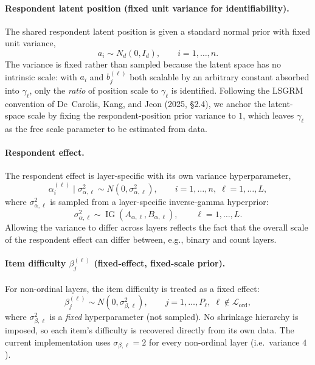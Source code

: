 \documentclass[11pt]{article}
\DeclareMathOperator{\IG}{IG}
\begin{document}
\paragraph{Respondent latent position (fixed unit variance for identifiability).}
The shared respondent latent position is given a standard normal prior with
fixed unit variance,
\begin{equation}
    a_i \sim N_d(0,I_d),\qquad i=1,\dots,n.
    \label{eq:a-prior}
\end{equation}
The variance is fixed rather than sampled because the latent space has no
intrinsic scale: with $a_i$ and $b_j^{(\ell)}$ both scalable by an arbitrary
constant absorbed into $\gamma_\ell$, only the \emph{ratio} of position scale
to $\gamma_\ell$ is identified.  Following the LSGRM convention of
De~Carolis, Kang, and Jeon (2025, \S2.4), we anchor the latent-space scale by
fixing the respondent-position prior variance to $1$, which leaves
$\gamma_\ell$ as the free scale parameter to be estimated from data.

\paragraph{Respondent effect.}
The respondent effect is layer-specific with its own variance hyperparameter,
\begin{equation}
    \alpha_i^{(\ell)}\mid \sigma_{\alpha,\ell}^2
    \sim N(0,\sigma_{\alpha,\ell}^2),
    \qquad i=1,\dots,n,\;\ell=1,\dots,L,
    \label{eq:alpha-prior}
\end{equation}
where $\sigma_{\alpha,\ell}^2$ is sampled from a layer-specific inverse-gamma
hyperprior:
\begin{equation}
    \sigma_{\alpha,\ell}^2 \sim \IG(A_{\alpha,\ell},B_{\alpha,\ell}),
    \qquad \ell=1,\dots,L.
    \label{eq:sigma-alpha-prior}
\end{equation}
Allowing the variance to differ across layers reflects the fact that the
overall scale of the respondent effect can differ between, e.g., binary and
count layers.

\paragraph{Item difficulty $\beta_j^{(\ell)}$ (fixed-effect, fixed-scale prior).}
For non-ordinal layers, the item difficulty is treated as a fixed effect:
\begin{equation}
    \beta_j^{(\ell)}\sim N(0,\sigma_{\beta,\ell}^2),
    \qquad j=1,\dots,P_\ell,\;\ell\notin\mathcal L_{\mathrm{ord}},
    \label{eq:beta-prior}
\end{equation}
where $\sigma_{\beta,\ell}^2$ is a \emph{fixed} hyperparameter (not sampled).
No shrinkage hierarchy is imposed, so each item's difficulty is recovered
directly from its own data.  The current implementation uses $\sigma_{\beta,\ell}=2$
for every non-ordinal layer (i.e.\ variance $4$).
\end{document}
